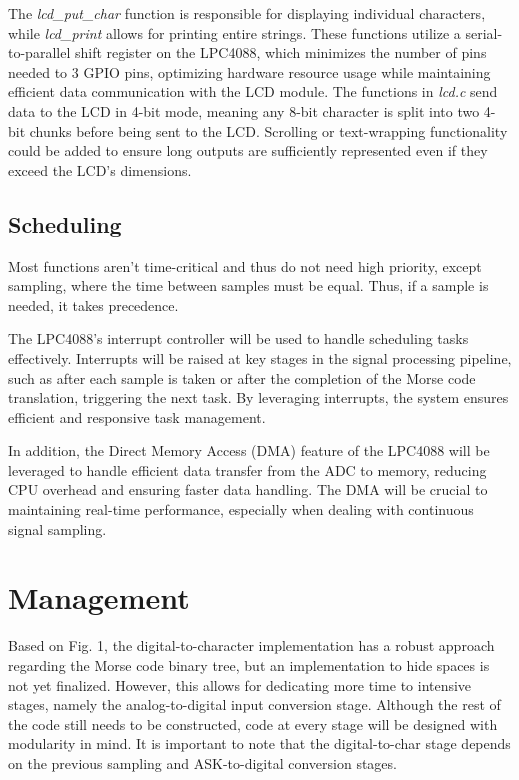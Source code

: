 \documentclass{cce2014-design}
\begin{document}
The \textit{lcd\_put\_char} function is responsible for displaying individual characters, while \textit{lcd\_print} allows for printing entire strings. These functions utilize a serial-to-parallel shift register on the LPC4088, which minimizes the number of pins needed to 3 GPIO pins, optimizing hardware resource usage while maintaining efficient data communication with the LCD module. The functions in \textit{lcd.c} send data to the LCD in 4-bit mode, meaning any 8-bit character is split into two 4-bit chunks before being sent to the LCD. Scrolling or text-wrapping functionality could be added to ensure long outputs are sufficiently represented even if they exceed the LCD's dimensions.

\subsection{Scheduling}
Most functions aren’t time-critical and thus do not need high priority, except sampling, where the time between samples must be equal. Thus, if a sample is needed, it takes precedence.

The LPC4088’s interrupt controller will be used to handle scheduling tasks effectively. Interrupts will be raised at key stages in the signal processing pipeline, such as after each sample is taken or after the completion of the Morse code translation, triggering the next task. By leveraging interrupts, the system ensures efficient and responsive task management.

In addition, the Direct Memory Access (DMA) feature of the LPC4088 will be leveraged to handle efficient data transfer from the ADC to memory, reducing CPU overhead and ensuring faster data handling. The DMA will be crucial to maintaining real-time performance, especially when dealing with continuous signal sampling.

\section{Management}
Based on Fig. 1, the digital-to-character implementation has a robust approach regarding the Morse code binary tree, but an implementation to hide spaces is not yet finalized. However, this allows for dedicating more time to intensive stages, namely the analog-to-digital input conversion stage. Although the rest of the code still needs to be constructed, code at every stage will be designed with modularity in mind. It is important to note that the digital-to-char stage depends on the previous sampling and ASK-to-digital conversion stages.
\end{document}
